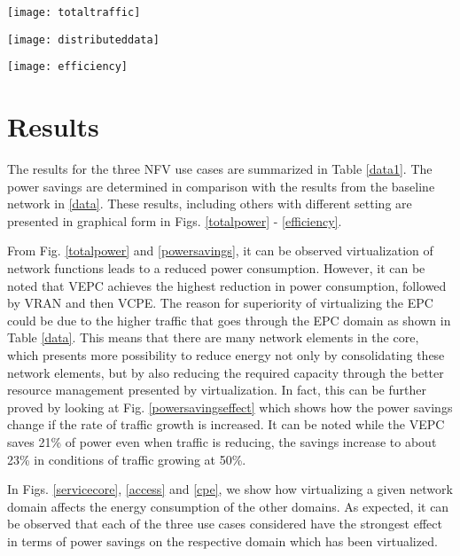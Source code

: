 \documentclass[conference]{IEEEtran}
\begin{document}
 \begin{figure*}[t]
\begin{minipage}{.30\textwidth}
\centering
\resizebox{.95\textwidth}{!}
{\texttt{[image: totaltraffic]}}
  \caption{Total Traffic}
  \label{totaltraffic}
\end{minipage}
\begin{minipage}{.40\textwidth}
\centering
\resizebox{.95\textwidth}{!}
{\texttt{[image: distributeddata]}}
  \caption{Traffic Distribution}
  \label{distributed}
\end{minipage}
\begin{minipage}{.30\textwidth}
\centering
\resizebox{.95\textwidth}{!}
{\texttt{[image: efficiency]}}
  \caption{Efficiency}
  \label{efficiency}
\end{minipage}
\end{figure*}




\section{Results}\label{results}

The results for the three NFV use cases are summarized in Table \ref{data1}. The power savings are determined in comparison with the results from the baseline network in \ref{data}. These results, including others with different setting are presented in graphical form in Figs. \ref{totalpower} - \ref{efficiency}.

From Fig. \ref{totalpower} and \ref{powersavings}, it can be observed virtualization of network functions leads to a reduced power consumption. However, it can be noted that VEPC achieves the highest reduction in power consumption, followed by VRAN and then VCPE. The reason for superiority of virtualizing the EPC could be due to the higher traffic that goes through the EPC domain as shown in Table \ref{data}. This means that there are many network elements in the core, which presents more possibility to reduce energy not only by consolidating these network elements, but by also reducing the required capacity through the better resource management presented by virtualization. In fact, this can be further proved by looking at Fig. \ref{powersavingseffect} which shows how the power savings change if the rate of traffic growth is increased. It can be noted while the VEPC saves 21\% of power even when traffic is reducing, the savings increase to about 23\% in conditions of traffic growing at 50\%.

In Figs. \ref{servicecore}, \ref{access} and \ref{cpe}, we show how virtualizing a given network domain affects the energy consumption of the other domains. As expected, it can be observed that each of the three use cases considered have the strongest effect in terms of power savings on the respective domain which has been virtualized.
\end{document}
